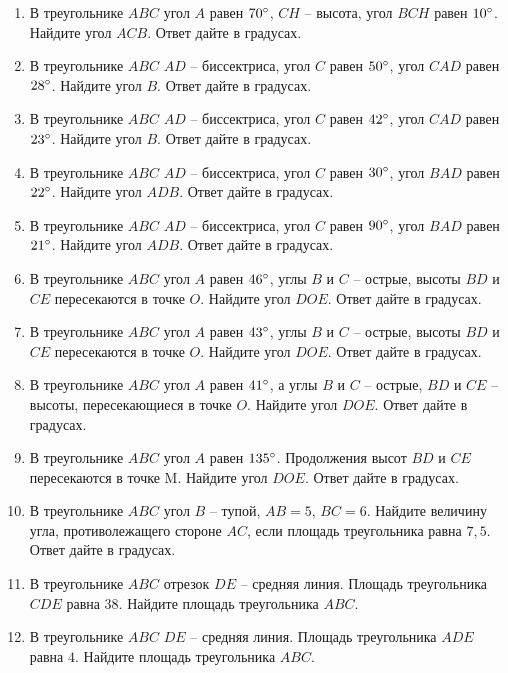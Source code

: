 \documentclass[12pt, a4paper]{article}
\begin{document}
\begin{enumerate}
		\item В треугольнике \( ABC \) угол \( A \) равен \( 70 \degree\), \( CH \) – высота, угол \( BCH \) равен \( 10\degree \). Найдите угол \( ACB \). Ответ дайте в градусах.
		\item В треугольнике \( ABC \) \( AD \) – биссектриса, угол \( C \) равен \( 50\degree \), угол \( CAD \) равен \( 28\degree \). Найдите угол \( B \). Ответ дайте в градусах.
		\item В треугольнике \( ABC \) \( AD \) – биссектриса, угол \( C \) равен \( 42\degree \), угол \( CAD \) равен \( 23 \degree\). Найдите угол \( B \). Ответ дайте в градусах.
		\item  В треугольнике \( ABC \) \( AD \) – биссектриса, угол \( C \) равен \( 30\degree \), угол \( BAD \) равен \( 22\degree \). Найдите угол \( ADB \). Ответ дайте в градусах.
		\item В треугольнике \( ABC \) \( AD \) – биссектриса, угол \( C \) равен \( 90\degree \), угол \( BAD \) равен \( 21\degree \). Найдите угол \( ADB \). Ответ дайте в градусах.
		\item В треугольнике \( ABC \) угол \( A \) равен \( 46\degree \), углы \( B \) и \( C \) – острые, высоты \( BD \) и \( CE \) пересекаются в точке \( O \). Найдите угол \( DOE \). Ответ дайте в градусах.
		\item В треугольнике \( ABC \) угол \( A \) равен \( 43\degree \), углы \( B \) и \( C \)  – острые, высоты \( BD \) и \( CE \) пересекаются в точке \( O \). Найдите угол \( DOE \). Ответ дайте в градусах.
		\item В треугольнике \( ABC \) угол \( A \) равен \( 41 \degree\), а углы \( B \) и \( C \) – острые, \( BD \) и \( CE \) – высоты, пересекающиеся в точке \(O\). Найдите угол \(DOE\). Ответ дайте в градусах.
		\item В треугольнике \( ABC \) угол \( A \) равен \( 135\degree \). Продолжения высот \( BD \) и \( CE \) пересекаются в точке M. Найдите угол \( DOE \). Ответ дайте в градусах.
		\item В треугольнике \( ABC \) угол \( B \) – тупой, \(AB=5\), \(BC=6\). Найдите величину угла, противолежащего стороне \( AC \), если площадь треугольника равна \( 7,5 \). Ответ дайте в градусах.
		\item В треугольнике \( ABC \) отрезок \( DE \) – средняя линия. Площадь треугольника \( CDE \) равна \( 38 \). Найдите площадь треугольника \( ABC \).
		\item В треугольнике \( ABC \) \(  DE \) – средняя линия. Площадь треугольника \( ADE \) равна \( 4 \). Найдите площадь треугольника \( ABC \).

\end{enumerate}
\end{document}

